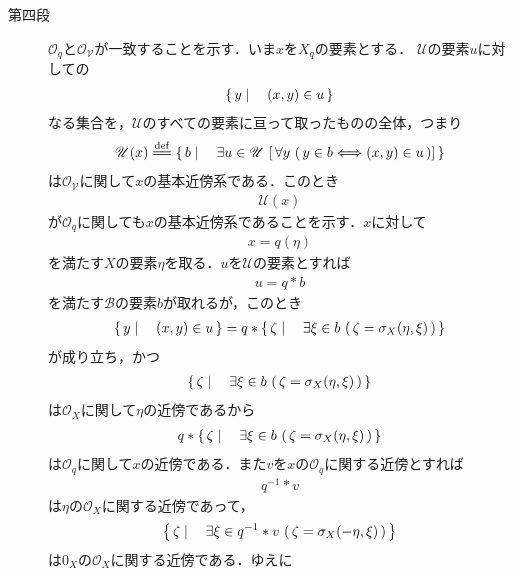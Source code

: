 \begin{sketch}
\begin{description}
				
			\item[第四段]
				$\mathscr{O}_q$と$\mathscr{O}_{\mathscr{V}}$が一致することを示す．いま$x$を$X_q$の要素とする．
				$\mathscr{U}$の要素$u$に対しての
				\begin{align}
					\left\{\, y \mid \quad (x,y) \in u\, \right\}
				\end{align}
				なる集合を，$\mathscr{U}$のすべての要素に亘って取ったものの全体，つまり
				\begin{align}
					\mathscr{U}(x) \defeq 
					\Set{b}{\exists u \in \mathscr{U}\, 
					\left[\, \forall y\, \left(\, y \in b \Longleftrightarrow (x,y) \in u\, \right) \right]}
				\end{align}
				は$\mathscr{O}_{\mathscr{V}}$に関して$x$の基本近傍系である．このとき
				\begin{align}
					\mathscr{U}(x)
				\end{align}
				が$\mathscr{O}_q$に関しても$x$の基本近傍系であることを示す．$x$に対して
				\begin{align}
					x = q(\eta)
				\end{align}
				を満たす$X$の要素$\eta$を取る．$u$を$\mathscr{U}$の要素とすれば
				\begin{align}
					u = q \ast b
				\end{align}
				を満たす$\mathscr{B}$の要素$b$が取れるが，このとき
				\begin{align}
					\left\{\, y \mid \quad (x,y) \in u\, \right\} = q \ast \left\{\, \zeta \mid \quad \exists \xi \in b\, 
					\left(\, \zeta = \sigma_X(\eta,\xi)\, \right)\, \right\}
				\end{align}
				が成り立ち，かつ
				\begin{align}
					\left\{\, \zeta \mid \quad \exists \xi \in b\, \left(\, \zeta = \sigma_X(\eta,\xi)\, \right)\, \right\}
				\end{align}
				は$\mathscr{O}_X$に関して$\eta$の近傍であるから
				\begin{align}
					q \ast \left\{\, \zeta \mid \quad \exists \xi \in b\, \left(\, \zeta = \sigma_X(\eta,\xi)\, \right)\, \right\}
				\end{align}
				は$\mathscr{O}_q$に関して$x$の近傍である．また$v$を$x$の$\mathscr{O}_q$に関する近傍とすれば
				\begin{align}
					q^{-1} \ast v
				\end{align}
				は$\eta$の$\mathscr{O}_X$に関する近傍であって，
				\begin{align}
					\left\{\, \zeta \mid \quad \exists \xi \in q^{-1} \ast v\, \left(\, \zeta = \sigma_X(-\eta,\xi)\, \right)\, \right\}
				\end{align}
				は$0_X$の$\mathscr{O}_X$に関する近傍である．ゆえに

\end{description}
\end{sketch}
